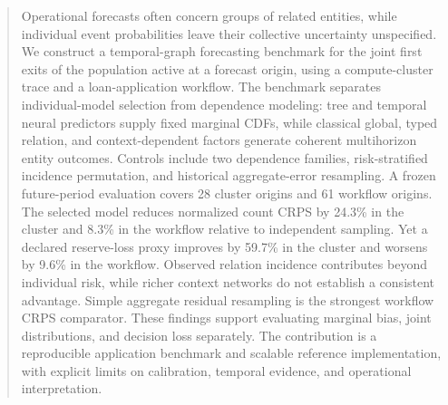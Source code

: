 \begin{abstract}
Operational forecasts often concern groups of related entities, while
individual event probabilities leave their collective uncertainty unspecified.
We construct a temporal-graph forecasting benchmark for the joint first exits
of the population active at a forecast origin, using a compute-cluster trace
and a loan-application workflow. The benchmark separates individual-model
selection from dependence modeling: tree and temporal neural predictors supply
fixed marginal CDFs, while classical global, typed relation, and
context-dependent factors generate coherent multihorizon entity outcomes.
Controls include two dependence families, risk-stratified incidence
permutation, and historical aggregate-error resampling. A frozen future-period
evaluation covers 28 cluster origins and 61 workflow origins. The selected
model reduces normalized count CRPS by 24.3\% in the cluster and 8.3\% in the
workflow relative to independent sampling. Yet a declared reserve-loss proxy
improves by 59.7\% in the cluster and worsens by 9.6\% in the workflow.
Observed relation incidence contributes beyond individual risk, while richer
context networks do not establish a consistent advantage. Simple aggregate
residual resampling is the strongest workflow CRPS comparator. These findings
support evaluating marginal bias, joint distributions, and decision loss
separately. The contribution is a reproducible application benchmark and
scalable reference implementation, with explicit limits on calibration,
temporal evidence, and operational interpretation.
\end{abstract}
